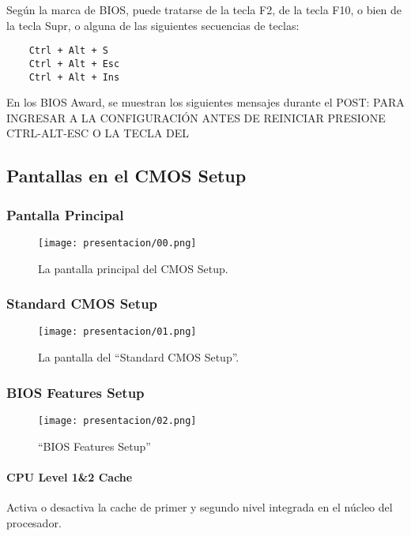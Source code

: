 \documentclass[12pt,oneside,a4paper]{article}
\begin{document}
	Según la marca de BIOS, puede tratarse de la tecla F2, de la tecla F10, o
	bien de la tecla Supr, o alguna de las siguientes secuencias de teclas: 

	\begin{verbatim}
	Ctrl + Alt + S 
	Ctrl + Alt + Esc 
	Ctrl + Alt + Ins 
	\end{verbatim}

	En los BIOS Award, se muestran los siguientes mensajes durante el POST:
	PARA INGRESAR A LA CONFIGURACIÓN ANTES DE REINICIAR PRESIONE CTRL-ALT-ESC O LA TECLA DEL

	\newpage
	\subsection{Pantallas en el CMOS Setup}{\label{sub:pantallas en el cmos setup}}

		\subsubsection{Pantalla Principal}{\label{sub:pantalla principal}}
			\begin{figure}[H]
				\centering
					\texttt{[image: presentacion/00.png]}
				\caption{La pantalla principal del CMOS Setup.}
			\end{figure}

		\subsubsection{Standard CMOS Setup}{\label{sub:Standard cmos setup}}
			\begin{figure}[H]
				\centering
					\texttt{[image: presentacion/01.png]}
				\caption{La pantalla del ``Standard CMOS Setup''.}
			\end{figure}

		\subsubsection{BIOS Features Setup}{\label{sub:bios features setup}}
			\begin{figure}[H]
				\centering
					\texttt{[image: presentacion/02.png]}
				\caption{``BIOS Features Setup''}
			\end{figure}

			\paragraph{CPU Level 1\&2 Cache}
			Activa o desactiva la cache de primer y segundo nivel integrada en
			el núcleo del procesador.
\end{document}
